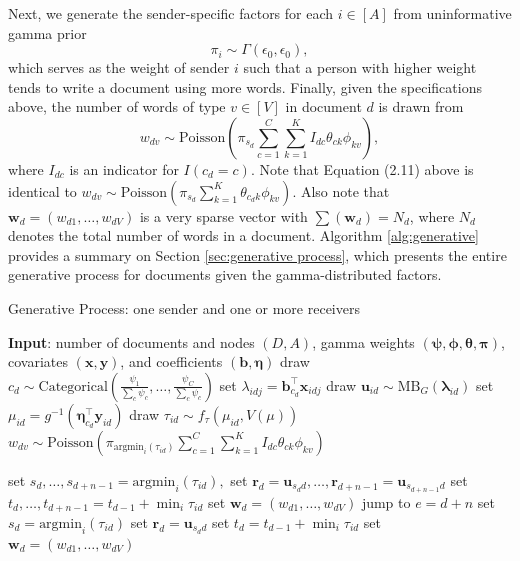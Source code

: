 \documentclass[ba]{imsart}
\def\spacingset#1{\renewcommand{\baselinestretch}%
	{#1}\small\normalsize} \spacingset{1}
\numberwithin{equation}{section}
\theoremstyle{plain}
\begin{document}
		Next, we generate the sender-specific factors for each  $i \in [A]$ from uninformative gamma prior
		\begin{equation}
			\pi_{i}\sim \Gamma(\epsilon_0,\epsilon_0),
		\end{equation}
		which serves as the weight of sender $i$ such that a person with higher weight tends to write a document using more words. Finally, given the specifications above, the number of words of type $v\in [V]$ in document $d$ is drawn from 
		\begin{equation}
			w_{dv} \sim \mbox{Poisson}(\pi_{s_d}\sum_{c=1}^C \sum_{k=1}^K I_{dc} \theta_{ck}\phi_{kv}),
		\end{equation}
		where $I_{dc}$ is an indicator for $I(c_d=c)$. Note that Equation (2.11) above is identical to $w_{dv} \sim \mbox{Poisson}(\pi_{s_d}\sum_{k=1}^K \theta_{c_dk}\phi_{kv})$. Also note that $\boldsymbol{w}_d = (w_{d1},\ldots,w_{dV})$ is a very sparse vector with $\sum(\boldsymbol{w}_d) = N_d$, where $N_d$ denotes the total number of words in a document. Algorithm \ref{alg:generative} provides a summary on Section \ref{sec:generative process}, which presents the entire generative process for documents given the gamma-distributed factors. ~
	\begin{algorithm}[!t]
		\spacingset{1}
		\SetAlgoLined
		\caption{Generative Process: one sender and one or more receivers}
	\begin{algorithmic}
		\STATE \textbf{Input}: number of documents and nodes $(D, A)$, gamma weights $(\boldsymbol{\psi}, \boldsymbol{\phi},\boldsymbol{\theta},\boldsymbol{\pi})$, covariates $(\boldsymbol{x}, \boldsymbol{y})$, and coefficients $(\boldsymbol{b}, \boldsymbol{\eta})$
		\vskip 0.1in
		\STATE	draw $c_d\sim \mbox{Categorical}(\frac{\psi_1}{\sum_c \psi_c},\ldots,\frac{\psi_C}{\sum_c\psi_c})$
		\STATE	set $\lambda_{idj} = {\boldsymbol{b}^{\top}_{c_d}}\boldsymbol{x}_{idj}$
		\ENDFOR
		\STATE	draw $\boldsymbol{u}_{id}  \sim
		\mbox{MB}_G(\boldsymbol{\lambda}_{id})$
		\STATE		set $\mu_{id} = g^{-1}({\boldsymbol{\eta}^\top_{c_d}} \boldsymbol{y}_{id})$
		\STATE		draw $\tau_{id} \sim f_\tau(\mu_{id}, V(\mu))$
		\STATE $w_{dv} \sim \mbox{Poisson}(\pi_{\mbox{argmin}_{i}(\tau_{id})}\sum_{c=1}^C \sum_{k=1}^K I_{dc} \theta_{ck}\phi_{kv})$
		\ENDFOR
		\ENDFOR
		
		\STATE	set $s_d,\ldots, s_{d+n-1}=\mbox{argmin}_{i}(\tau_{id}),$
		\STATE	set $\boldsymbol{r}_d=\boldsymbol{u}_{s_d d},\ldots,\boldsymbol{r}_{d+n-1}=\boldsymbol{u}_{s_{d+n-1} d}$
		\STATE	set $t_d, \ldots, t_{d+n-1}=t_{d-1} + \min_i\tau_{id}$
		\STATE set $\boldsymbol{w}_d=(w_{d1},\ldots,w_{dV})$
		\STATE		jump to $e = d+n$
		\ELSE
		\STATE	set $s_d= \mbox{argmin}_{i}(\tau_{id})$
		\STATE		set $\boldsymbol{r}_d= \boldsymbol{u}_{s_d d}$
		\STATE	set $t_d =t_{d-1} + \min_i\tau_{id}$
			\STATE set $\boldsymbol{w}_d=(w_{d1},\ldots,w_{dV})$
		\ENDIF
		\ENDFOR
	\end{algorithmic}
		\label{alg:generative}
	\end{algorithm}
	\newpage
\end{document}
